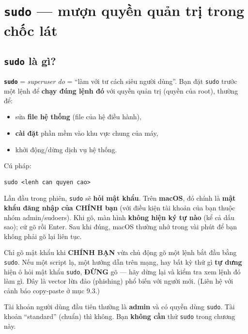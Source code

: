 \documentclass[12pt,a4paper]{article}
\newcommand{\cmd}[1]{\texttt{#1}}
\begin{document}
\section{\texttt{sudo} --- mượn quyền quản trị trong chốc lát}

\subsection{\texttt{sudo} là gì?}

\textbf{\cmd{sudo}} = \textit{superuser do} = ``làm với tư cách siêu người dùng''. Bạn
đặt \cmd{sudo} trước một lệnh để \textbf{chạy đúng lệnh đó} với quyền quản trị (quyền
của root), thường để:

\begin{itemize}
\item sửa \textbf{file hệ thống} (file của hệ điều hành),
\item \textbf{cài đặt} phần mềm vào khu vực chung của máy,
\item khởi động/dừng dịch vụ hệ thống.
\end{itemize}

Cú pháp:
\begin{Verbatim}
sudo <lenh can quyen cao>
\end{Verbatim}
Lần đầu trong phiên, \cmd{sudo} sẽ \textbf{hỏi mật khẩu}. Trên \textbf{macOS}, đó
chính là \textbf{mật khẩu đăng nhập của CHÍNH bạn} (với điều kiện tài khoản của bạn
thuộc nhóm admin/sudoers). Khi gõ, màn hình \textbf{không hiện ký tự nào} (kể cả dấu
sao); cứ gõ rồi Enter. Sau khi đúng, macOS thường nhớ trong vài phút để bạn không
phải gõ lại liên tục.

\begin{warnbox}
Chỉ gõ mật khẩu khi \textbf{CHÍNH BẠN} vừa chủ động gõ một lệnh bắt đầu bằng
\cmd{sudo}. Nếu một script lạ, một hướng dẫn trên mạng, hay bất kỳ thứ gì
\textbf{tự dưng} hiện ô hỏi mật khẩu \cmd{sudo}, \textbf{ĐỪNG} gõ --- hãy dừng lại và
kiểm tra xem lệnh đó làm gì. Đây là vector lừa đảo (phishing) phổ biến với người
mới. (Liên hệ với cảnh báo copy-paste ở mục 9.3.)
\end{warnbox}

\begin{notebox}
Tài khoản người dùng đầu tiên thường là \textbf{admin} và có quyền dùng \cmd{sudo}.
Tài khoản ``standard'' (chuẩn) thì không. Bạn \textbf{không cần} thử \cmd{sudo} trong
chương này.
\end{notebox}
\end{document}
